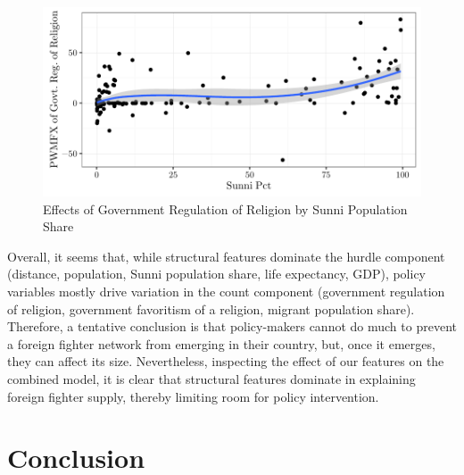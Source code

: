 \documentclass[12pt]{article}
\begin{document}
\begin{figure}[!h]
	\centering
	\includegraphics[scale=.85]{tabs_figs/hetplotGovtRegSunni.pdf}
	\caption{Effects of Government Regulation of Religion by Sunni Population Share}	\label{fig:hetplot2} 
\end{figure}

Overall, it seems that, while structural features dominate the hurdle component (distance, population, Sunni population share, life expectancy, GDP), policy variables mostly drive variation in the count component (government regulation of religion, government favoritism of a religion, migrant population share). Therefore, a tentative conclusion is that policy-makers cannot do much to prevent a foreign fighter network from emerging in their country, but, once it emerges, they can affect its size. Nevertheless, inspecting the effect of our features on the combined model, it is clear that structural features dominate in explaining foreign fighter supply, thereby limiting room for policy intervention.

\section{Conclusion}	\label{sec:conclusion}
\end{document}
